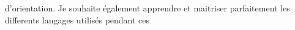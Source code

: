 \documentclass[a4paper, 11pt, french]{report}
\begin{document}
                                                                                                                                                              d'orientation.
                                                                                                                                                                  \newline
                                                                                                                                                                      Je
                                                                                                                                                                      souhaite
                                                                                                                                                                      également
                                                                                                                                                                      apprendre
                                                                                                                                                                      et
                                                                                                                                                                      maitriser
                                                                                                                                                                      parfaitement
                                                                                                                                                                      les
                                                                                                                                                                      differents
                                                                                                                                                                      langages
                                                                                                                                                                      utilisés
                                                                                                                                                                      pendant
                                                                                                                                                                      ces
\end{document}

